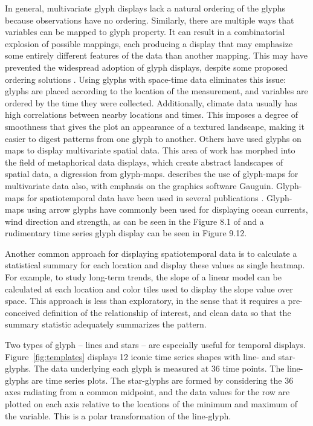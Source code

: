 \documentclass[oneside]{article}
\begin{document}
In general, multivariate glyph displays lack a natural ordering of the glyphs because observations have no ordering. Similarly, there are multiple ways that variables can be mapped to glyph property. It can result in a combinatorial explosion of possible mappings, each producing a display that may emphasize some entirely different features of the data than another mapping. This may have prevented the widespread adoption of glyph displays, despite some proposed ordering solutions \citep{kleiner:1981,hurley:2010}. Using glyphs with space-time data eliminates this issue: glyphs are placed according to the location of the measurement, and variables are ordered by the time they were collected. Additionally, climate data usually has high correlations between nearby locations and times. This imposes a degree of smoothness that gives the plot an appearance of a textured  landscape, making it easier to digest patterns from one glyph to another. Others \citep{pickett:1988} have used glyphs on maps to display multivariate spatial data. This area of work has morphed into the field of metaphorical data displays, which create abstract landscapes of spatial data, a digression from glyph-maps. \citet{gribov:2006} describes the use of glyph-maps for multivariate data also, with emphasis on the graphics software Gauguin. Glyph-maps for spatiotemporal data have been used in several publications \citep{carr:1992,eden:2010,hobbs:2010}. Glyph-maps using arrow glyphs have commonly been used for displaying ocean currents, wind direction and strength, as can be seen in the Figure 8.1 of \citet{IPCC} and a rudimentary time series glyph display can be seen in Figure 9.12. 

Another common approach for displaying spatiotemporal data is to calculate a statistical summary for each location and display these values as single heatmap. For example, to study long-term trends, the slope of a linear model can be calculated at each location and color tiles used to display the slope value over space. This approach is less than exploratory, in the sense that it requires a pre-conceived definition of the relationship of interest, and clean data so that the summary statistic adequately summarizes the pattern. 

Two types of glyph -- lines and stars -- are especially useful for temporal displays. Figure~\ref{fig:templates} displays 12 iconic time series shapes with line- and star-glyphs. The data underlying each glyph is measured at 36 time points. The line-glyphs are   time series plots. The star-glyphs are formed by considering the 36 axes radiating from a common midpoint, and the data values for the row are plotted on each axis relative to the locations of the minimum and maximum of the variable. This is a polar transformation of the line-glyph.
\end{document}

